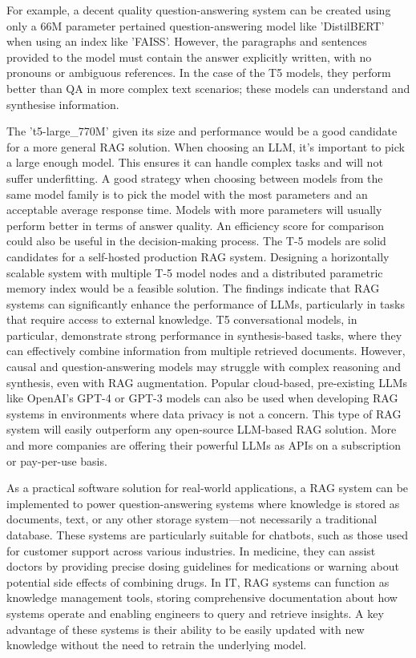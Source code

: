 \documentclass{wseas}
\begin{document}
For example, a decent quality question-answering system can be created 
using only a 66M parameter pertained question-answering model like 'DistilBERT' when using an index like 'FAISS'. 
However, the paragraphs and sentences provided to the model must contain the answer explicitly written, with
no pronouns or ambiguous references. In the case of the T5 models, they perform better than QA in more complex 
text scenarios; these models can understand and synthesise information.

The 't5-large\_770M' given its size and performance would be a good candidate for a more general RAG solution.
When choosing an LLM, it's important to pick a large enough model. This ensures it can handle complex tasks and
will not suffer underfitting. A good strategy when choosing between models from the same model family is to pick the model 
with the most parameters and an acceptable average response time. Models with more parameters will usually
perform better in terms of answer quality. An efficiency score for comparison could also be useful in the decision-making process.
The T-5 models are solid candidates for a self-hosted production RAG system. Designing a horizontally scalable 
system with multiple T-5 model nodes and a distributed parametric memory index would be a feasible solution. 
The findings indicate that RAG systems can significantly enhance the performance of LLMs, particularly in 
tasks that require access to external knowledge. T5 conversational models, in particular, demonstrate strong 
performance in synthesis-based tasks, where they can effectively combine information from multiple retrieved documents.
However, causal and question-answering models may struggle with complex reasoning and synthesis, even with RAG augmentation.  
Popular cloud-based, pre-existing LLMs like OpenAI's GPT-4 or GPT-3 models can also be used when developing 
RAG systems in environments where data privacy is not a concern. This type of RAG system will easily outperform any open-source LLM-based RAG solution. 
More and more companies are offering their powerful LLMs as APIs on a subscription or pay-per-use basis.

As a practical software solution for real-world applications, a RAG system can be implemented to power question-answering systems where knowledge is stored as documents, text, or any other storage system—not necessarily a traditional database. These systems are particularly suitable for chatbots, such as those used for customer support across various industries. In medicine, they can assist doctors by providing precise dosing guidelines for medications or warning about potential side effects of combining drugs. In IT, RAG systems can function as knowledge management tools, storing comprehensive documentation about how systems operate and enabling engineers to query and retrieve insights. A key advantage of these systems is their ability to be easily updated with new knowledge without the need to retrain the underlying model.
\end{document}
